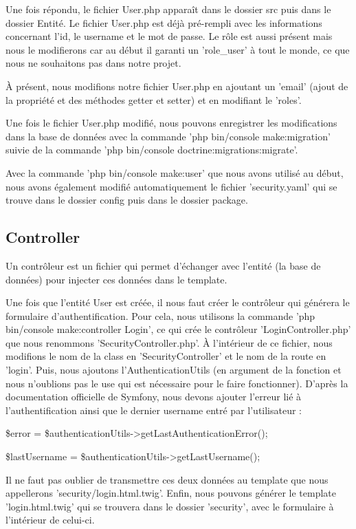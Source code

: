 \documentclass{article}
\theoremstyle{definition}
\theoremstyle{remark}
\begin{document}
Une fois répondu, le fichier User.php apparaît dans le dossier src puis dans le dossier Entité. Le fichier User.php est déjà pré-rempli avec les informations concernant l'id, le username et le mot de passe. Le rôle est aussi présent mais nous le modifierons car au début il garanti un 'role\_user' à tout le monde, ce que nous ne souhaitons pas dans notre projet. 

À présent, nous modifions notre fichier User.php en ajoutant un 'email' (ajout de la propriété et des méthodes getter et setter) et en modifiant le 'roles'.

Une fois le fichier User.php modifié, nous pouvons enregistrer les modifications dans la base de données avec la commande 'php bin/console make:migration' suivie de la commande 'php bin/console doctrine:migrations:migrate'.

Avec la commande 'php bin/console make:user' que nous avons utilisé au début, nous avons également modifié automatiquement le fichier 'security.yaml' qui se trouve dans le dossier config puis dans le dossier package.

\subsection{Controller}

Un contrôleur est un fichier qui permet d'échanger avec l'entité (la base de données) pour injecter ces données dans le template.

Une fois que l'entité User est créée, il nous faut créer le contrôleur qui générera le formulaire d'authentification. Pour cela, nous utilisons la commande 'php bin/console make:controller Login', ce qui crée le contrôleur 'LoginController.php' que nous renommons 'SecurityController.php'. À l'intérieur de ce fichier, nous modifions le nom de la class en 'SecurityController' et le nom de la route en 'login'. Puis, nous ajoutons l'AuthenticationUtils (en argument de la fonction et nous n'oublions pas le use qui est nécessaire pour le faire fonctionner). D'après la documentation officielle de Symfony, nous devons ajouter l'erreur lié à l'authentification ainsi que le dernier username entré par l'utilisateur :

\$error = \$authenticationUtils->getLastAuthenticationError();

\$lastUsername = \$authenticationUtils->getLastUsername();

Il ne faut pas oublier de transmettre ces deux données au template que nous appellerons 'security/login.html.twig'. Enfin, nous pouvons générer le template 'login.html.twig' qui se trouvera dans le dossier 'security', avec le formulaire à l'intérieur de celui-ci.
\end{document}
